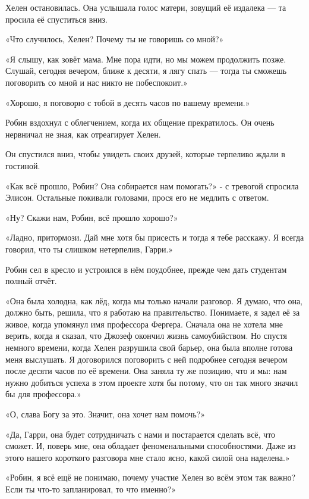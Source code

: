 \documentclass[a5paper, 9pt,
final, openany, twoside=true]{memoir}
\begin{document}
Хелен остановилась. Она услышала голос матери, зовущий её издалека — та просила её спуститься вниз.

«Что случилось, Хелен? Почему ты не говоришь со мной?»

«Я слышу, как зовёт мама. Мне пора идти, но мы можем продолжить позже. Слушай, сегодня вечером, ближе к десяти, я лягу спать — тогда ты сможешь поговорить со мной и нас никто не побеспокоит.»

«Хорошо, я поговорю с тобой в десять часов по вашему времени.»\bigskip

Робин вздохнул с облегчением, когда их общение прекратилось. Он очень нервничал не зная, как отреагирует Хелен.

Он спустился вниз, чтобы увидеть своих друзей, которые терпеливо ждали в гостиной.

«Как всё прошло, Робин? Она собирается нам помогать?» - с тревогой спросила Элисон. Остальные покивали головами, прося его не медлить с ответом.

«Ну? Скажи нам, Робин, всё прошло хорошо?»

«Ладно, притормози. Дай мне хотя бы присесть и тогда я тебе расскажу. Я всегда говорил, что ты слишком нетерпелив, Гарри.»

Робин сел в кресло и устроился в нём поудобнее, прежде чем дать студентам полный отчёт.

«Она была холодна, как лёд, когда мы только начали разговор. Я думаю, что она, должно быть, решила, что я работаю на правительство. Понимаете, я задел её за живое, когда упомянул имя профессора Фергера. Сначала она не хотела мне верить, когда я сказал, что Джозеф окончил жизнь самоубийством. Но спустя немного времени, когда Хелен разрушила свой барьер, она была вполне готова меня выслушать. Я договорился поговорить с ней подробнее сегодня вечером после десяти часов по её времени. Она заняла ту же позицию, что и мы: нам нужно добиться успеха в этом проекте хотя бы потому, что он так много значил бы для профессора.»

«О, слава Богу за это. Значит, она хочет нам помочь?»

«Да, Гарри, она будет сотрудничать с нами и постарается сделать всё, что сможет. И, поверь мне, она обладает феноменальными способностями. Даже из этого нашего короткого разговора мне стало ясно, какой силой она наделена.»

«Робин, я всё ещё не понимаю, почему участие Хелен во всём этом так важно? Если ты что-то запланировал, то что именно?»
\end{document}

